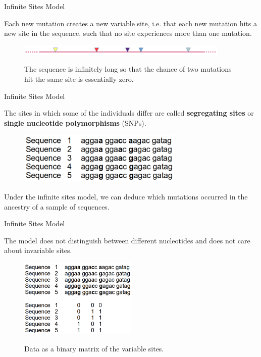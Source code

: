 \begin{frame}{Infinite Sites Model}

	\begin{block}{}
		Each new mutation creates a new variable site, i.e. that each new mutation hits a new site in the sequence, such that no site experiences more than one mutation.
	\end{block}

	\bigskip

	\begin{figure}
        	\includegraphics[width=0.9\textwidth]{Pics/iam} \\
		\caption{\small The sequence is infinitely long so that the chance of two mutations hit the same site is essentially zero.}
        \end{figure}

\end{frame}


\begin{frame}{Infinite Sites Model}

	The sites in which some of the individuals differ are called
	\textbf{segregating sites} or \textbf{single nucleotide polymorphisms} (SNPs).

 	\begin{figure}
                \includegraphics[width=0.7\textwidth]{Pics/sequences} 
        \end{figure}

	Under the infinite sites model, we can deduce which mutations occurred
	in the ancestry of a sample of sequences.

\end{frame}


\begin{frame}{Infinite Sites Model}

	The model does not distinguish between different nucleotides and does
        not care about invariable sites.

	\begin{figure}
                \includegraphics[width=0.5\textwidth]{Pics/sequences01} \\
		\caption{\small Data as a binary matrix of the variable sites.}
        \end{figure}

\end{frame}


